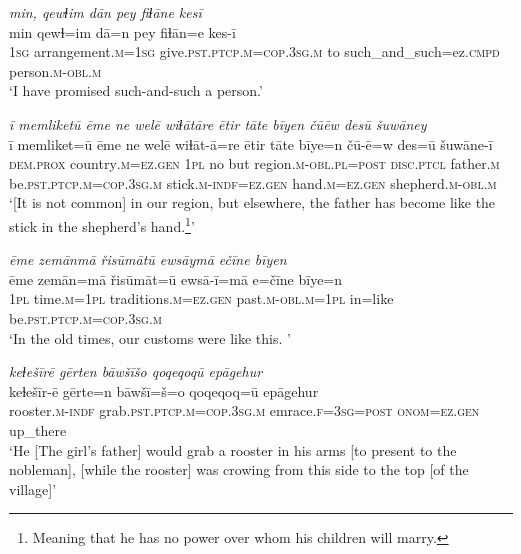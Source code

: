 \ea \label{RE.36}
\textit{min, qewɫim dān pey fiɫāne kesī} \\ 
\gll min qewɫ=im dā=n pey fiɫān=e kes-ī \\ 
 \textsc{1sg} arrangement\textsc{.m}\textsc{=\textsc{1sg}} give\textsc{.pst}\textsc{.ptcp}\textsc{.m}\textsc{=cop}\textsc{.3sg}\textsc{.m} to such\_and\_such=ez\textsc{.cmpd} person\textsc{.m}\textsc{-obl}\textsc{.m} \\ 
\glt `I have promised such-and-such a person.'
\z 
 
\ea \label{RE.41}
\textit{ī memliketū ēme ne welē wiɫātāre ētir tāte bīyen čūēw desū šuwāney} \\ 
\gll ī memliket=ū ēme ne welē wiɫāt-ā=re ētir tāte bīye=n čū-ē=w des=ū šuwāne-ī \\ 
 \textsc{dem.prox} country\textsc{.m}\textsc{=ez.gen} \textsc{1pl} no but region\textsc{.m}\textsc{-obl}\textsc{.pl}\textsc{=\textsc{post}} \textsc{disc.ptcl} father\textsc{.m} be\textsc{.pst}\textsc{.ptcp}\textsc{.m}\textsc{=cop}\textsc{.3sg}\textsc{.m} stick\textsc{.m}\textsc{-indf}\textsc{=ez.gen} hand\textsc{.m}\textsc{=ez.gen} shepherd\textsc{.m}\textsc{-obl}\textsc{.m} \\ 
\glt `[It is not common] in our region, but elsewhere, the father has become like the stick in the shepherd’s hand.\footnote{Meaning that he has no power over whom his children will marry.}'
\z 
 
\ea \label{RE.42}
\textit{ēme zemānmā řisūmātū ewsāymā ečīne bīyen} \\ 
\gll ēme zemān=mā řisūmāt=ū ewsā-ī=mā e=čīne bīye=n \\ 
 \textsc{1pl} time\textsc{.m}\textsc{=\textsc{1pl}} traditions\textsc{.m}\textsc{=ez.gen} past\textsc{.m}\textsc{-obl}\textsc{.m}\textsc{=\textsc{1pl}} in=like be\textsc{.pst}\textsc{.ptcp}\textsc{.m}\textsc{=cop}\textsc{.3sg}\textsc{.m} \\ 
\glt `In the old times, our customs were like this. '
\z 
 
\ea \label{RE.48}
\textit{keɫešīrē gērten bāwšīšo qoqeqoqū epāgehur} \\ 
\gll keɫešīr-ē gērte=n bāwšī=š=o qoqeqoq=ū epāgehur \\ 
 rooster\textsc{.m}\textsc{-indf} grab\textsc{.pst}\textsc{.ptcp}\textsc{.m}\textsc{=cop}\textsc{.3sg}\textsc{.m} emrace\textsc{.f}\textsc{=3sg}\textsc{=\textsc{post}} \textsc{onom}\textsc{=ez.gen} up\_there \\ 
\glt `He [The girl’s father] would grab a rooster in his arms [to present to the nobleman], [while the rooster] was crowing from this side to the top [of the village]'
\z 
 
